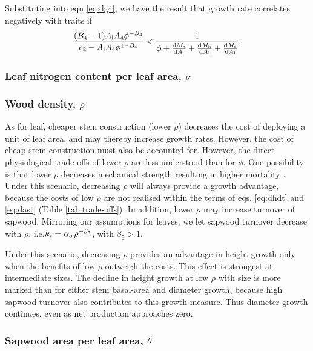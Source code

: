 \documentclass[a4paper,11pt]{article}
\begin{document}
Substituting into eqn \ref{eq:dg4}, we have the result that growth rate correlates negatively with traits if
\begin{equation} \label{eq:G6}
\frac{(B_4-1) A_{\rm l} A_4\phi ^{-B_4}}{c_2 - A_{\rm l} A_4 \phi ^{1-B_4}}
< \frac{1}{\phi
 + \frac{{\rm d}M_{\rm s}}{{\rm d}A_{\rm l}} + \frac{{\rm d}M_\textrm
 {b}}{{\rm d}A_{\rm l}} + \frac{{\rm d}M_{\rm r}}{{\rm d}A_{\rm l}}}.
\end{equation}

\subsubsection{Leaf nitrogen content per leaf area, $\nu$}

\subsubsection{Wood density, $\rho$}

As for leaf, cheaper stem construction (lower $\rho$) decreases the cost of deploying a unit of leaf area, and may thereby increase growth rates. However, the cost of cheap stem construction must also be accounted for. However, the direct physiological trade-offs of lower $\rho$ are less understood than for $\phi$. One possibility is that lower $\rho$ decreases mechanical strength resulting in higher mortality \citep{Chave-2009, Wright-2010}. Under this scenario, decreasing $\rho$ will always provide a growth advantage, because the costs of low $\rho$ are not realised within the terms of eqs. \ref{eq:dhdt} and \ref{eq:dast} (Table \ref{tab:trade-offs}). In addition, lower $\rho$ may increase turnover of sapwood. Mirroring our assumptions for leaves, we let sapwood turnover decrease with $\rho$, i.e.$k_{\rm s}=\alpha_5 \, \rho^{-\beta_5}$, with $\beta_5 > 1$.

Under this scenario, decreasing $\rho$ provides an advantage in height growth only when the benefits of low $\rho$ outweigh the costs. This effect is strongest at intermediate sizes. The decline in height growth at low $\rho$ with size is more marked than for either stem basal-area and diameter growth, because high sapwood turnover also contributes to this growth measure. Thus diameter growth continues, even as net production approaches zero.

\subsubsection{Sapwood area per leaf area, $\theta$}
\end{document}

